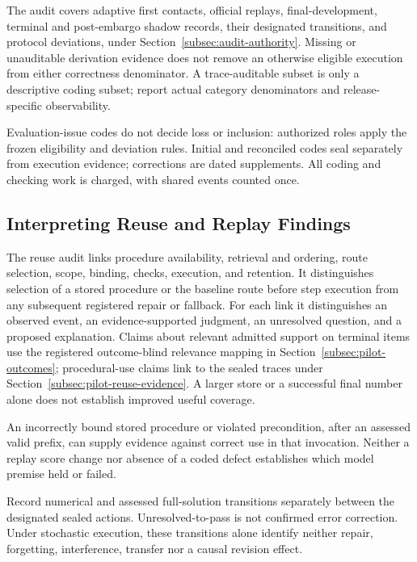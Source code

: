 \documentclass[10pt]{article} %
\providecommand{\1}{\mathbf{1}}  %
\theoremstyle{remark}
\theoremstyle{definition}
\begin{document}
The audit covers adaptive first contacts, official replays, final-development,
terminal and post-embargo shadow records, their designated transitions, and
protocol deviations, under Section~\ref{subsec:audit-authority}. Missing or
unauditable derivation evidence does not remove an otherwise eligible
execution from either correctness denominator. A trace-auditable subset is
only a descriptive coding subset; report actual category denominators and
release-specific observability.

Evaluation-issue codes do not decide loss or inclusion: authorized roles
apply the frozen eligibility and deviation rules. Initial and reconciled
codes seal separately from execution evidence; corrections are dated
supplements. All coding and checking work is charged, with shared events
counted once.

\subsection{Interpreting Reuse and Replay Findings}
\label{subsec:audit-interpretation}

The reuse audit links procedure availability, retrieval and ordering,
route selection, scope, binding, checks, execution, and retention.
It distinguishes selection of a stored procedure or the baseline
route before step execution from any subsequent registered repair
or fallback. For each link it distinguishes an observed event, an
evidence-supported judgment, an unresolved question, and a proposed
explanation. Claims about relevant admitted support
on terminal items use the registered outcome-blind relevance mapping
in Section~\ref{subsec:pilot-outcomes}; procedural-use claims link to
the sealed traces under Section~\ref{subsec:pilot-reuse-evidence}.
A larger store or a successful final number alone does not establish
improved useful coverage.

An incorrectly bound stored procedure or violated precondition, after an
assessed valid prefix, can supply evidence against correct use in that
invocation. Neither a
replay score change nor absence of a coded defect establishes which model
premise held or failed.

Record numerical and assessed full-solution transitions separately between
the designated sealed actions. Unresolved-to-pass is not confirmed error
correction. Under stochastic
execution, these transitions alone identify neither repair, forgetting,
interference, transfer nor a causal revision effect.
\end{document}
